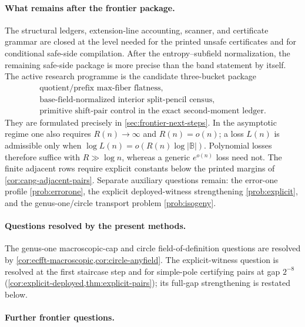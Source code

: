 \documentclass[11pt]{article}
\theoremstyle{definition}
\theoremstyle{remark}
\newcommand{\B}{\mathbb{B}}
\begin{document}
\paragraph{What remains after the frontier package.}
The structural ledgers, extension-line accounting, scanner, and certificate grammar are closed at the level needed for the printed unsafe certificates and for conditional safe-side compilation.  After the entropy--subfield normalization, the remaining safe-side package is more precise than the band statement by itself.  The active research programme is the candidate three-bucket package
\[
\begin{gathered}
        \text{quotient/prefix max-fiber flatness},\\
        \text{base-field-normalized interior split-pencil census},\\
        \text{primitive shift-pair control in the exact second-moment ledger}.
\end{gathered}
\]
They are formulated precisely in \cref{sec:frontier-next-steps}.  In the asymptotic regime one also requires $R(n)\to\infty$ and $R(n)=o(n)$; a loss $L(n)$ is admissible only when $\log L(n)=o(R(n)\log|\B|)$.  Polynomial losses therefore suffice with $R\gg\log n$, whereas a generic $e^{o(n)}$ loss need not.  The finite adjacent rows require explicit constants below the printed margins of \cref{cor:capg-adjacent-pairs}.  Separate auxiliary questions remain: the error-one profile \cref{prob:errorone}, the explicit deployed-witness strengthening \cref{prob:explicit}, and the genus-one/circle transport problem \cref{prob:isogeny}.

\paragraph{Questions resolved by the present methods.}
The genus-one macroscopic-cap and circle field-of-definition questions are resolved by \cref{cor:ecfft-macroscopic,cor:circle-anyfield}.  The explicit-witness question is resolved at the first staircase step and for simple-pole certifying pairs at gap $2^{-8}$ \textup(\cref{cor:explicit-deployed,thm:explicit-pairs}\textup); its full-gap strengthening is restated below.

\paragraph{Further frontier questions.}
\end{document}
